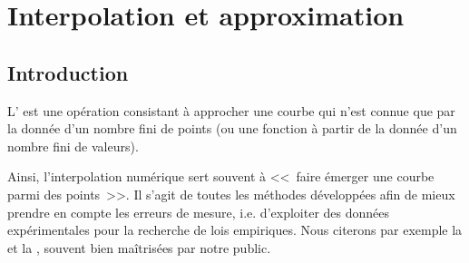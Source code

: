 \chapter{Interpolation et approximation}\label{chap-interpolation}


\medskip
\section{Introduction}

L' est une opération consistant à approcher une courbe qui n'est connue que 
par la donnée d'un nombre fini de points (ou une fonction à partir de la donnée d'un nombre fini de valeurs). 

Ainsi, l'interpolation numérique sert souvent à <<~faire émerger une courbe parmi des points~>>.
Il s'agit de toutes les méthodes développées afin de mieux prendre en compte les erreurs de mesure, i.e.
d'exploiter des données expérimentales pour la recherche de lois empiriques. 
Nous citerons par exemple la  et la 
, souvent bien maîtrisées par notre public.

